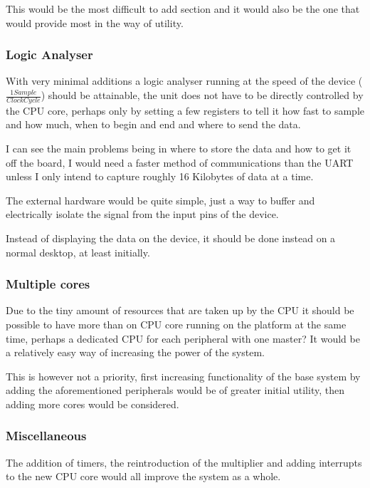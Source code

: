 \documentclass	[a4paper, 10pt]	{article}
\begin{document}
      This would be the most difficult to add section and it would also be the one
      that would provide most in the way of utility.

      \subsubsection{Logic Analyser}

      With very minimal additions a logic analyser running at the speed of the device
      ($\frac{1 Sample}{Clock Cycle}$) should be attainable, the unit does not have
      to be directly controlled by the CPU core, perhaps only by setting a few registers
      to tell it how fast to sample and how much, when to begin and end and where to
      send the data.

      I can see the main problems being in where to store the data and how to get it
      off the board, I would need a faster method of communications than the UART
      unless I only intend to capture roughly 16 Kilobytes of data at a time.

      The external hardware would be quite simple, just a way to buffer and electrically
      isolate the signal from the input pins of the device.

      Instead of displaying the data on the device, it should be done instead on a
      normal desktop, at least initially.

      \subsubsection{Multiple cores}

      Due to the tiny amount of resources that are taken up by the CPU it should be
      possible to have more than on CPU core running on the platform at the same
      time, perhaps a dedicated CPU for each peripheral with one master? It would
      be a relatively easy way of increasing the power of the system.

      This is however not a priority, first increasing functionality of the base
      system by adding the aforementioned peripherals would be of greater initial
      utility, then adding more cores would be considered.

      \subsubsection{Miscellaneous}
      
      The addition of timers, the reintroduction of the multiplier and adding 
      interrupts to the new CPU core would all improve the system as a whole.
\end{document}
